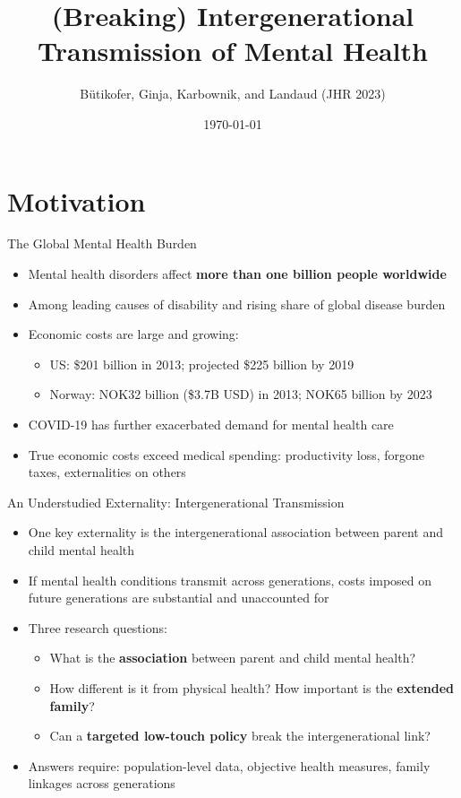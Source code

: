 \documentclass[aspectratio=169]{beamer}
\title{(Breaking) Intergenerational Transmission of Mental Health}
\subtitle{}
\author{B\"{u}tikofer, Ginja, Karbownik, and Landaud (JHR 2023)}
\institute{University of Georgia}
\date{\today}
\begin{document}
\begin{frame}
  \titlepage
\end{frame}

\section{Motivation}

\begin{frame}{The Global Mental Health Burden}
  \begin{itemize}
    \item Mental health disorders affect \textbf{more than one billion people worldwide}
    \item Among leading causes of disability and rising share of global disease burden
    \item Economic costs are large and growing:
    \begin{itemize}
      \item US: \$201 billion in 2013; projected \$225 billion by 2019
      \item Norway: NOK32 billion (\$3.7B USD) in 2013; NOK65 billion by 2023
    \end{itemize}
    \item COVID-19 has further exacerbated demand for mental health care
    \item True economic costs exceed medical spending: productivity loss, forgone taxes, externalities on others
  \end{itemize}
\end{frame}

\begin{frame}{An Understudied Externality: Intergenerational Transmission}
  \begin{itemize}
    \item One key externality is the intergenerational association between parent and child mental health
    \item If mental health conditions transmit across generations, costs imposed on future generations are substantial and unaccounted for
    \item Three research questions:
    \begin{itemize}
      \item What is the \textbf{association} between parent and child mental health?
      \item How different is it from physical health? How important is the \textbf{extended family}?
      \item Can a \textbf{targeted low-touch policy} break the intergenerational link?
    \end{itemize}
    \item Answers require: population-level data, objective health measures, family linkages across generations
  \end{itemize}
\end{frame}
\end{document}
